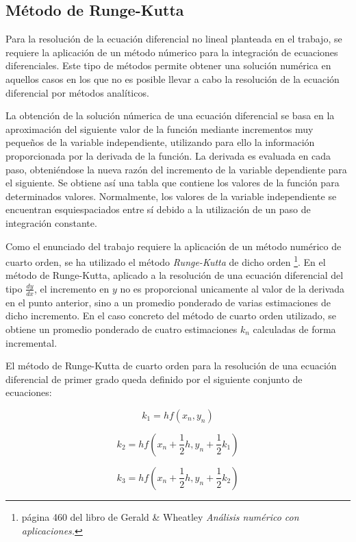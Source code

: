 \documentclass[11pt]{article}
\begin{document}
\subsection{Método de Runge-Kutta}
Para la resolución de la ecuación diferencial no lineal planteada en el trabajo,
se requiere la aplicación de un método númerico para la integración de
ecuaciones diferenciales. Este tipo de métodos permite obtener una solución
numérica en aquellos casos en los que no es posible llevar a cabo la resolución
de la ecuación diferencial por métodos analíticos. 

La obtención de la solución númerica de una ecuación diferencial se basa en la
aproximación del siguiente valor de la función mediante incrementos muy pequeños
de la variable independiente, utilizando para ello la información proporcionada
por la derivada de la función. La derivada es evaluada en cada paso,
obteniéndose la nueva razón del incremento de la variable dependiente para el
siguiente. Se obtiene así una tabla que contiene los valores de la función para
determinados valores. Normalmente, los valores de la variable independiente se
encuentran esquiespaciados entre sí debido a la utilización de un paso de
integración constante.

Como el enunciado del trabajo requiere la aplicación de un método numérico de
cuarto orden, se ha utilizado el método \textit{Runge-Kutta} de dicho orden
\footnote{página 460 del libro de Gerald \& Wheatley \textit{Análisis numérico
con aplicaciones.}}. En el método de Runge-Kutta, aplicado a la resolución de
una ecuación diferencial del tipo $\frac{dy}{dx}$, el incremento en $y$ no es
proporcional unicamente al valor de la derivada en el punto anterior, sino a un
promedio ponderado de varias estimaciones de dicho incremento. En el caso
concreto del método de cuarto orden utilizado, se obtiene un promedio ponderado
de cuatro estimaciones $k_n$ calculadas de forma incremental.

El método de Runge-Kutta de cuarto orden para la resolución de una ecuación
diferencial de primer grado queda definido por el siguiente conjunto de
ecuaciones:

\begin{equation}
	k_1 = hf(x_n, y_n)
\end{equation}

\begin{equation}
	k_2 = hf(x_n + \frac{1}{2}h, y_n + \frac{1}{2}k_1)
\end{equation}

\begin{equation}
	k_3 = hf(x_n + \frac{1}{2}h, y_n + \frac{1}{2}k_2)
\end{equation}
\end{document}
